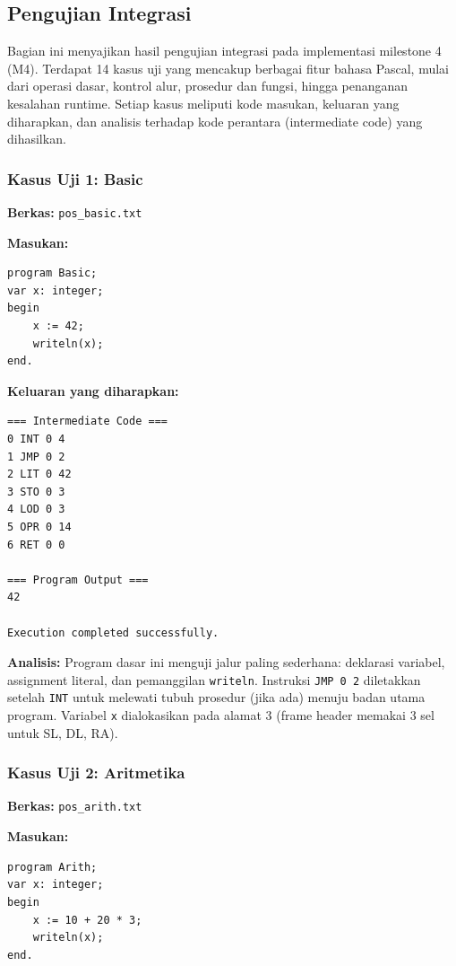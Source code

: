 \documentclass[12pt,a4paper]{article}
\begin{document}
\subsection{Pengujian Integrasi}

Bagian ini menyajikan hasil pengujian integrasi pada implementasi milestone 4 (M4). Terdapat 14 kasus uji yang mencakup berbagai fitur bahasa Pascal, mulai dari operasi dasar, kontrol alur, prosedur dan fungsi, hingga penanganan kesalahan runtime. Setiap kasus meliputi kode masukan, keluaran yang diharapkan, dan analisis terhadap kode perantara (intermediate code) yang dihasilkan.

\subsubsection{Kasus Uji 1: Basic}

\textbf{Berkas:} \texttt{pos\_basic.txt}

\textbf{Masukan:}
\begin{lstlisting}
program Basic;
var x: integer;
begin
    x := 42;
    writeln(x);
end.
\end{lstlisting}

\textbf{Keluaran yang diharapkan:}
\begin{verbatim}
=== Intermediate Code ===
0 INT 0 4
1 JMP 0 2
2 LIT 0 42
3 STO 0 3
4 LOD 0 3
5 OPR 0 14
6 RET 0 0

=== Program Output ===
42

Execution completed successfully.
\end{verbatim}

\textbf{Analisis:} Program dasar ini menguji jalur paling sederhana: deklarasi variabel, assignment literal, dan pemanggilan \texttt{writeln}. Instruksi \texttt{JMP 0 2} diletakkan setelah \texttt{INT} untuk melewati tubuh prosedur (jika ada) menuju badan utama program. Variabel \texttt{x} dialokasikan pada alamat 3 (frame header memakai 3 sel untuk SL, DL, RA).

\subsubsection{Kasus Uji 2: Aritmetika}

\textbf{Berkas:} \texttt{pos\_arith.txt}

\textbf{Masukan:}
\begin{lstlisting}
program Arith;
var x: integer;
begin
    x := 10 + 20 * 3;
    writeln(x);
end.
\end{lstlisting}
\end{document}
